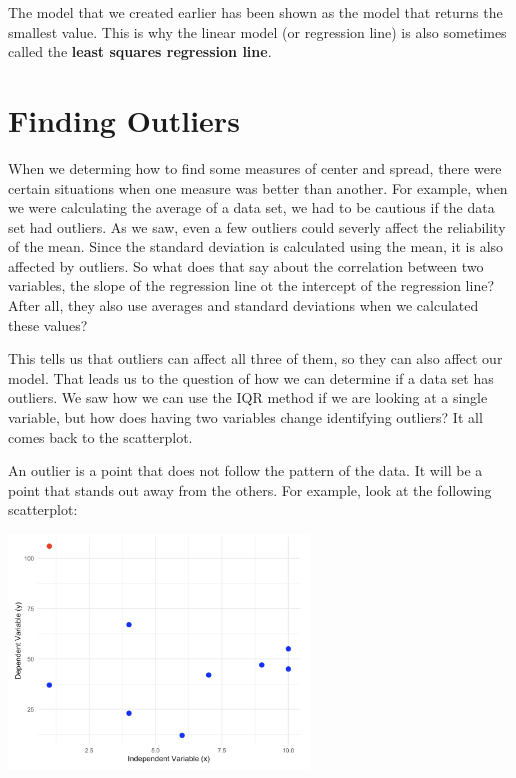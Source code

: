\documentclass[
  letterpaper,
  DIV=11,
  numbers=noendperiod]{scrreprt}
\begin{document}
The model that we created earlier has been shown as the model that
returns the smallest value. This is why the linear model (or regression
line) is also sometimes called the \textbf{least squares regression
line}.

\section*{Finding Outliers}\label{finding-outliers}


When we determing how to find some measures of center and spread, there
were certain situations when one measure was better than another. For
example, when we were calculating the average of a data set, we had to
be cautious if the data set had outliers. As we saw, even a few outliers
could severly affect the reliability of the mean. Since the standard
deviation is calculated using the mean, it is also affected by outliers.
So what does that say about the correlation between two variables, the
slope of the regression line ot the intercept of the regression line?
After all, they also use averages and standard deviations when we
calculated these values?

This tells us that outliers can affect all three of them, so they can
also affect our model. That leads us to the question of how we can
determine if a data set has outliers. We saw how we can use the IQR
method if we are looking at a single variable, but how does having two
variables change identifying outliers? It all comes back to the
scatterplot.

An outlier is a point that does not follow the pattern of the data. It
will be a point that stands out away from the others. For example, look
at the following scatterplot:

\includegraphics[width=0.6\textwidth,height=\textheight]{./images/ROP_3.jpg}
\end{document}
